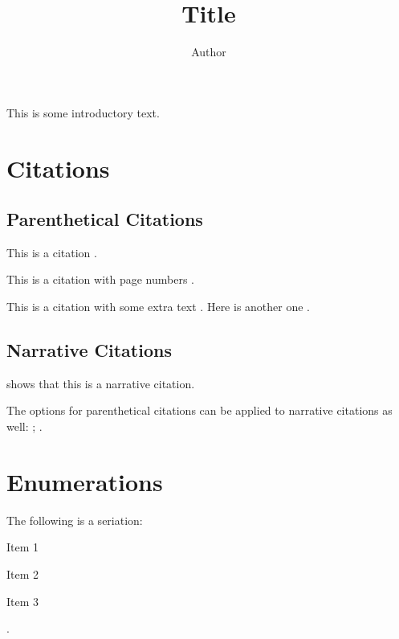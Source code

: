 \documentclass[stu,12pt,a4paper,biblatex,floatsintext]{apa7}
\title{Title}
\author{Author}
\affiliation{Affiliation}
\begin{document}
\maketitle

This is some introductory text.

\section{Citations}

\subsection{Parenthetical Citations}

This is a citation \parencite{example1970}.

This is a citation with page numbers \parencite[1-2]{example1970}.

This is a citation with some extra text \parencite[Appendix A]{example1970}. Here is another one \parencite[ch. 1 p. 1]{example1970}.

\subsection{Narrative Citations}

\textcite{example1970} shows that this is a narrative citation.

The options for parenthetical citations can be applied to narrative citations as well: \textcite[1-2]{example1970}; \textcite[Appendix A]{example1970}.

\section{Enumerations}

The following is a seriation: \begin{seriate}
	\item Item 1
	\item Item 2
	\item Item 3
\end{seriate}.
\end{document}
